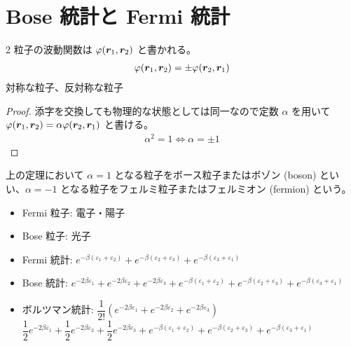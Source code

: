 \documentclass[a4paper,11pt]{jlreq}
\begin{document}
\section{Bose 統計と Fermi 統計}
\begin{theorem}
  2 粒子の波動関数は $\varphi(\bm{r}_1, \bm{r}_2)$ と書かれる。
  \begin{align}
    \varphi(\bm{r}_1, \bm{r}_2) = \pm \varphi(\bm{r}_2, \bm{r}_1)
  \end{align}
  対称な粒子、反対称な粒子
\end{theorem}
\begin{proof}
  添字を交換しても物理的な状態としては同一なので定数 $\alpha$ を用いて $\varphi(\bm{r}_1, \bm{r}_2) = \alpha\varphi(\bm{r}_2, \bm{r}_1)$ と書ける。
  \begin{align}
    \alpha^2 = 1 \iff \alpha = \pm 1
  \end{align}
\end{proof}

\begin{definition}
  上の定理において $\alpha = 1$ となる粒子をボース粒子またはボゾン (boson) といい、$\alpha = -1$ となる粒子をフェルミ粒子またはフェルミオン (fermion) という。

  \begin{itemize}
    \item Fermi 粒子: 電子・陽子
    \item Bose 粒子: 光子
  \end{itemize}
\end{definition}

\begin{itemize}
  \item Fermi 統計: $e^{-\beta(\varepsilon_1 + \varepsilon_2)} + e^{-\beta(\varepsilon_2 + \varepsilon_3)} + e^{-\beta(\varepsilon_3 + \varepsilon_1)}$
  \item Bose 統計: $e^{-2\beta\varepsilon_1} + e^{-2\beta\varepsilon_2} + e^{-2\beta\varepsilon_3} + e^{-\beta(\varepsilon_1 + \varepsilon_2)} + e^{-\beta(\varepsilon_2 + \varepsilon_3)} + e^{-\beta(\varepsilon_3 + \varepsilon_1)}$
  \item ボルツマン統計: $\dfrac{1}{2!}(e^{-2\beta\varepsilon_1} + e^{-2\beta\varepsilon_2} + e^{-2\beta\varepsilon_3})$ \\
        $\dfrac{1}{2}e^{-2\beta\varepsilon_1} + \dfrac{1}{2}e^{-2\beta\varepsilon_2} + \dfrac{1}{2}e^{-2\beta\varepsilon_3} + e^{-\beta(\varepsilon_1 + \varepsilon_2)} + e^{-\beta(\varepsilon_2 + \varepsilon_3)} + e^{-\beta(\varepsilon_3 + \varepsilon_1)}$
\end{itemize}
\end{document}
